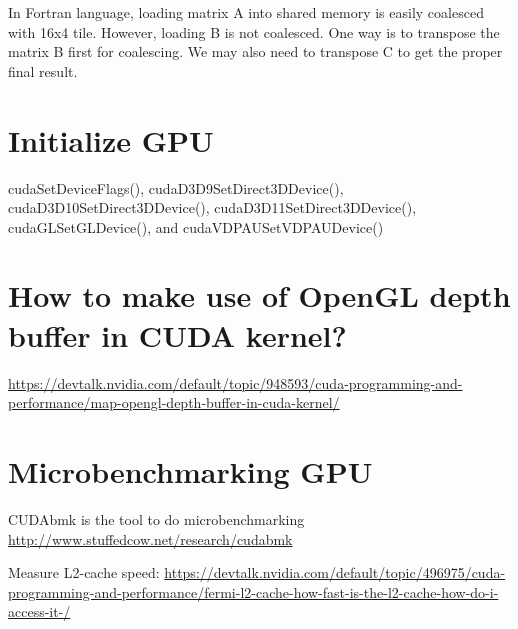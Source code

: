 In Fortran language, loading matrix A into shared memory is easily coalesced
with 16x4 tile. However, loading B is not coalesced. One way is to transpose the
matrix B first for coalescing. We may also need to transpose C to get the proper
final result. 


% 
% 

  \section{Initialize GPU}
  \label{sec:initialize_GPU}
  

cudaSetDeviceFlags(), cudaD3D9SetDirect3DDevice(), cudaD3D10SetDirect3DDevice(),
cudaD3D11SetDirect3DDevice(), cudaGLSetGLDevice(), and cudaVDPAUSetVDPAUDevice()

\section{How to make use of OpenGL depth buffer in CUDA kernel?}



\url{https://devtalk.nvidia.com/default/topic/948593/cuda-programming-and-performance/map-opengl-depth-buffer-in-cuda-kernel/}

\section{Microbenchmarking GPU}
\label{sec:microbenchmarking_GPU}


CUDAbmk is the tool to do microbenchmarking
\url{http://www.stuffedcow.net/research/cudabmk}


Measure L2-cache speed:
\url{https://devtalk.nvidia.com/default/topic/496975/cuda-programming-and-performance/fermi-l2-cache-how-fast-is-the-l2-cache-how-do-i-access-it-/}


